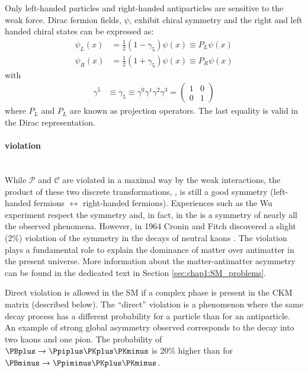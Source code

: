 Only left-handed particles and right-handed antiparticles are sensitive to the weak force. Dirac fermion fields, $\psi$, exhibit 
chiral symmetry and the right and left handed chiral states can be expressed as:
\begin{align}
	\psi_{L }(x) &= \frac{1}{2} (1-\gamma_{5})\psi (x) \equiv P_{L}  \psi (x) \\
	\psi_{R }(x) &= \frac{1}{2} (1+\gamma_{5}) \psi (x) \equiv P_{R}  \psi (x)
\end{align}
with
\begin{align*}
	\gamma^{5} &\equiv \gamma_{5} \equiv \gamma^{0}\gamma^{1}\gamma^{2}\gamma^{3} = \begin{pmatrix} 1 & 0 \\ 0 & 1 \end{pmatrix}
\end{align*}
where $P_{L}$ and $P_{L}$ are known as projection operators. The last equality is valid in the Dirac representation.



\paragraph{\CP violation}\mbox{}\\
While $\mathcal{P}$ and $\mathcal{C}$ are violated in a maximal way by the weak interactions, 
the product of these two discrete transformations, \CP, is still a good symmetry (left-handed fermions 
$\leftrightarrow$ right-handed fermions).  Experiences such as the Wu experiment respect the \CP 
symmetry and, in fact, in the \CP is a symmetry of nearly all the observed phenomena. However, in 
1964 Cronin and Fitch discovered a slight (2\%) violation of the \CP symmetry in the decays of neutral 
kaons \cite{Christenson:1964fg}. The \CP violation plays a fundamental role to explain the dominance of
matter over antimatter in the present universe. More information about the matter-antimatter asymmetry
can be found in the dedicated text in Section \ref{sec:chap1:SM_problems}. 

Direct \CP violation is allowed in the SM if a complex phase is present in the CKM matrix (described below).
The ``direct'' \CP violation is a phenomenon where the same decay process has a different probability for a 
particle than for an antiparticle. An example of strong global \CP asymmetry observed corresponds to the decay
into two kaons and one pion. The probability of $\PBplus \rightarrow \Ppiplus \PKplus \PKminus$ is 20\% higher 
than for $\PBminus \rightarrow \Ppiminus \PKplus \PKminus$. 

